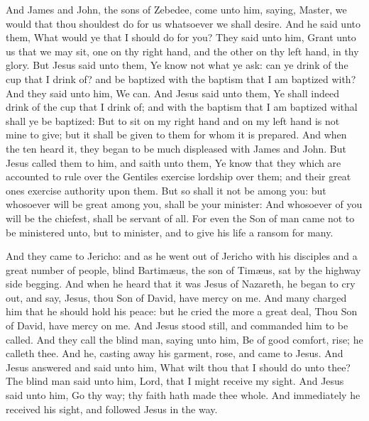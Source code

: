  And James and John, the sons of Zebedee, come unto him,
saying, Master, we would that thou shouldest do for us whatsoever we
shall desire.  And he said unto them, What would ye that
I should do for you?  They said unto him, Grant unto us
that we may sit, one on thy right hand, and the other on thy left hand,
in thy glory.  But Jesus said unto them, Ye know not what
ye ask: can ye drink of the cup that I drink of? and be baptized with
the baptism that I am baptized with?  And they said unto
him, We can. And Jesus said unto them, Ye shall indeed drink of the cup
that I drink of; and with the baptism that I am baptized withal shall ye
be baptized:  But to sit on my right hand and on my left
hand is not mine to give; but it shall be given to them for whom it is
prepared.  And when the ten heard it, they began to be
much displeased with James and John.  But Jesus called
them to him, and saith unto them, Ye know that they which are accounted
to rule over the Gentiles exercise lordship over them; and their great
ones exercise authority upon them.  But so shall it not
be among you: but whosoever will be great among you, shall be your
minister:  And whosoever of you will be the chiefest,
shall be servant of all.  For even the Son of man came
not to be ministered unto, but to minister, and to give his life a
ransom for many.

 And they came to Jericho: and as he went out of Jericho
with his disciples and a great number of people, blind Bartimæus, the
son of Timæus, sat by the highway side begging.  And when
he heard that it was Jesus of Nazareth, he began to cry out, and say,
Jesus, thou Son of David, have mercy on me.  And many
charged him that he should hold his peace: but he cried the more a great
deal, Thou Son of David, have mercy on me.  And Jesus
stood still, and commanded him to be called. And they call the blind
man, saying unto him, Be of good comfort, rise; he calleth thee.
 And he, casting away his garment, rose, and came to
Jesus.  And Jesus answered and said unto him, What wilt
thou that I should do unto thee? The blind man said unto him, Lord, that
I might receive my sight.  And Jesus said unto him, Go
thy way; thy faith hath made thee whole. And immediately he received his
sight, and followed Jesus in the way.

